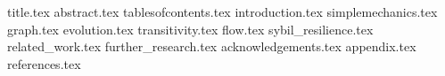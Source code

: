 \documentclass[11pt]{llncs}
\begin{document}
  {title.tex}
  \thispagestyle{plain}
  {abstract.tex}
  \clearpage
  {tablesofcontents.tex}
  {introduction.tex}
  {simplemechanics.tex}
  {graph.tex}
  {evolution.tex}
  {transitivity.tex}
  {flow.tex}
  {sybil_resilience.tex}
  {related_work.tex}
  {further_research.tex}
  {acknowledgements.tex}
  {appendix.tex}
  {references.tex}
\end{document}
